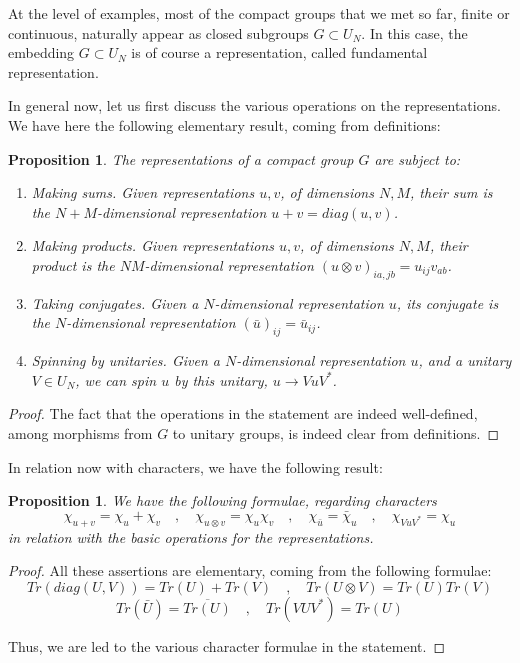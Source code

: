 \documentclass[12pt]{amsbook}
\newtheorem{proposition}[theorem]{Proposition}
\begin{document}
At the level of examples, most of the compact groups that we met so far, finite or continuous, naturally appear as closed subgroups $G\subset U_N$. In this case, the embedding $G\subset U_N$ is of course a representation, called fundamental representation.

\bigskip

In general now, let us first discuss the various operations on the representations. We have here the following elementary result, coming from definitions:

\begin{proposition}
The representations of a compact group $G$ are subject to:
\begin{enumerate}
\item Making sums. Given representations $u,v$, of dimensions $N,M$, 
their sum is the $N+M$-dimensional representation $u+v=diag(u,v)$.

\item Making products. Given representations $u,v$, of dimensions $N,M$, their product is the $NM$-dimensional representation $(u\otimes v)_{ia,jb}=u_{ij}v_{ab}$.

\item Taking conjugates. Given a $N$-dimensional representation $u$, its conjugate is the $N$-dimensional representation $(\bar{u})_{ij}=\bar{u}_{ij}$.

\item Spinning by unitaries. Given a $N$-dimensional representation $u$, and a unitary $V\in U_N$, we can spin $u$ by this unitary, $u\to VuV^*$.
\end{enumerate}
\end{proposition}

\begin{proof}
The fact that the operations in the statement are indeed well-defined, among morphisms from $G$ to unitary groups, is indeed clear from definitions.
\end{proof}

In relation now with characters, we have the following result:

\begin{proposition}
We have the following formulae, regarding characters
$$\chi_{u+v}=\chi_u+\chi_v\quad,\quad 
\chi_{u\otimes v}=\chi_u\chi_v\quad,\quad 
\chi_{\bar{u}}=\bar{\chi}_u\quad,\quad
\chi_{VuV^*}=\chi_u$$
in relation with the basic operations for the representations.
\end{proposition}

\begin{proof}
All these assertions are elementary, coming from the following formulae:
$$Tr(diag(U,V))=Tr(U)+Tr(V)\quad,\quad 
Tr(U\otimes V)=Tr(U)Tr(V)$$
$$Tr(\bar{U})=\overline{Tr(U)}\quad,\quad 
Tr(VUV^*)=Tr(U)$$

Thus, we are led to the various character formulae in the statement.
\end{proof}
\end{document}
